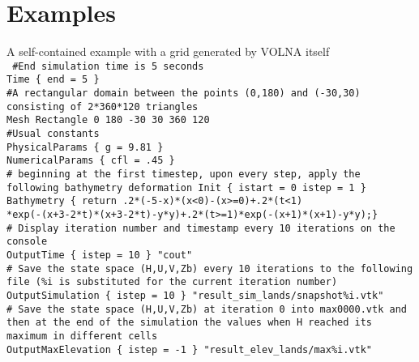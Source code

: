 \documentclass[11pt]{article}
\begin{document}
\section{Examples}
A self-contained example with a grid generated by VOLNA itself \\
{\tt
\#End simulation time is 5 seconds \\
Time \{ end = 5 \} \\
\#A rectangular domain between the points (0,180) and (-30,30) consisting of 2*360*120 triangles \\
Mesh Rectangle 0 180 -30 30 360 120 \\
\#Usual constants \\
PhysicalParams \{ g = 9.81 \} \\
NumericalParams \{ cfl = .45 \} \\
\# beginning at the first timestep, upon every step, apply the following bathymetry deformation
Init \{ istart = 0 istep = 1 \} Bathymetry \{ return .2*(-5-x)*(x<0)-(x>=0)+.2*(t<1) \\ *exp(-(x+3-2*t)*(x+3-2*t)-y*y)+.2*(t>=1)*exp(-(x+1)*(x+1)-y*y);\} \\
\# Display iteration number and timestamp every 10 iterations on the console \\
OutputTime \{ istep = 10 \} "cout" \\
\# Save the state space (H,U,V,Zb) every 10 iterations to the following file (\%i is substituted for the current iteration number) \\
OutputSimulation \{ istep = 10 \} "result\_sim\_lands/snapshot\%i.vtk" \\
\# Save the state space (H,U,V,Zb) at iteration 0 into max0000.vtk and then at the end of the simulation the values when H reached its maximum in different cells \\
OutputMaxElevation \{ istep = -1 \} "result\_elev\_lands/max\%i.vtk" \\
}
\\
\end{document}
